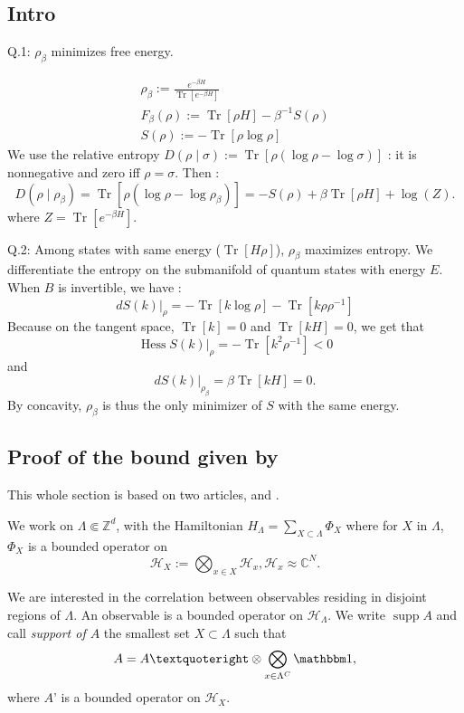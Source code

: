 \documentclass{article}
\DeclareMathOperator{\Tr}{Tr}
\DeclareMathOperator{\Hess}{Hess}
\DeclareMathOperator{\supp}{supp}
\begin{document}
\subsection{Intro}
Q.1: $\rho_\beta$ minimizes free energy.

\begin{eqnarray*}
   \rho_\beta:= \frac{e^{-\beta H}}{\Tr[e^{-\beta H}]}\\
F_\beta(\rho):=\Tr[\rho H]-\beta^{-1}S(\rho)\\
S(\rho):=-\Tr[\rho\log\rho]
\end{eqnarray*}
 We use the relative entropy $D(\rho\mid \sigma):=\Tr[\rho(\log \rho - \log  \sigma)]$ : it is nonnegative and zero iff $\rho=\sigma$.
 Then :
 $$
 D(\rho\mid\rho_\beta)=\Tr[\rho(\log\rho-\log\rho_\beta)]=-S(\rho)+\beta\Tr[\rho H]+\log(Z).
 $$
 where $Z=\Tr[e^{-\beta H}]$.
 
 Q.2: Among states with same energy ($\Tr[H\rho]$), $\rho_\beta$ maximizes entropy.
 We differentiate the entropy on the submanifold of quantum states with energy $E$.
 When $B$ is invertible, we have : $$
 dS(k)\vert_{\rho}=-\Tr[k\log \rho]-\Tr[k\rho\rho^{-1}]
 $$
 Because on the tangent space, $\Tr[k]=0$ and $\Tr[kH]=0$, we get that $$
 \Hess S(k)\vert_{\rho}=-\Tr[k^2\rho^{-1}]<0
 $$
 and $$
 dS(k)\vert_{\rho_\beta}=\beta\Tr[kH]=0.
 $$
 By concavity, $\rho_\beta$ is thus the only minimizer of $S$ with the same energy.
 
 \subsection{Proof of the bound given by \cite{froehlichPropertiesCorrelationsQuantum2015}}
 
 This whole section is based on two articles, \cite{froehlichPropertiesCorrelationsQuantum2015} and \cite{ueltschiClusterExpansionsCorrelation2005}.
 
 We work on $\Lambda\Subset \mathbb{Z}^d$, with the Hamiltonian $H_\Lambda=\sum_{X\subset \Lambda} \Phi_X$ where for $X$ in $\Lambda$, $\Phi_X$ is a bounded operator on $$\mathcal H_X:=\bigotimes_{x\in X}\mathcal H_x, \mathcal{H}_x\approx\mathbb C^N.$$
 
 We are interested in the correlation between observables residing in disjoint regions of $\Lambda$.
 An observable is a bounded operator on $\mathcal H_\Lambda$.
 We write $\supp A$ and call {\it support of $A$} the smallest set $X\subset \Lambda$ such that $$A=A’\otimes\bigotimes_{x\in \Lambda^C}\mathbbm 1,$$ where $A’$ is a bounded operator on $\mathcal H_X$.
 
\end{document}
